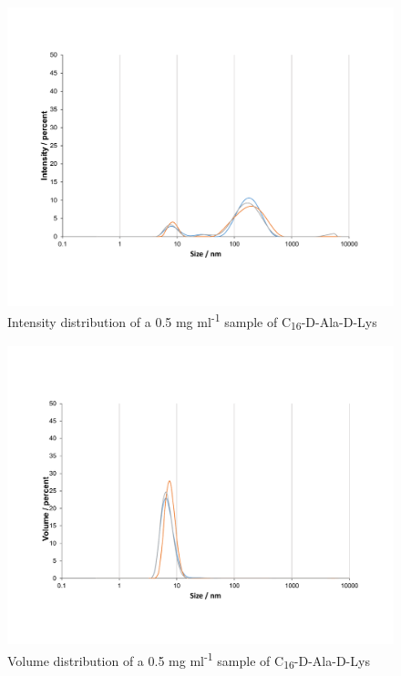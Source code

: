 \begin{figure} [ht!]
\centering
\includegraphics[scale=0.47]{DLS/KAT1_35_0_5mg_ml-1_size.pdf}
\caption{Intensity distribution of a 0.5 mg ml\textsuperscript{-1} sample of C\textsubscript{16}-D-Ala-D-Lys}
\label{intensity_0.5_KAT1.35}
\end{figure}
\begin{figure} [ht!]
\centering
\includegraphics[scale=0.47]{DLS/KAT1_35_0_5mg_ml-1_volume.pdf}
\caption{Volume distribution of a 0.5 mg ml\textsuperscript{-1} sample of C\textsubscript{16}-D-Ala-D-Lys}
\label{volume_0.5_KAT1.35}
\end{figure}

